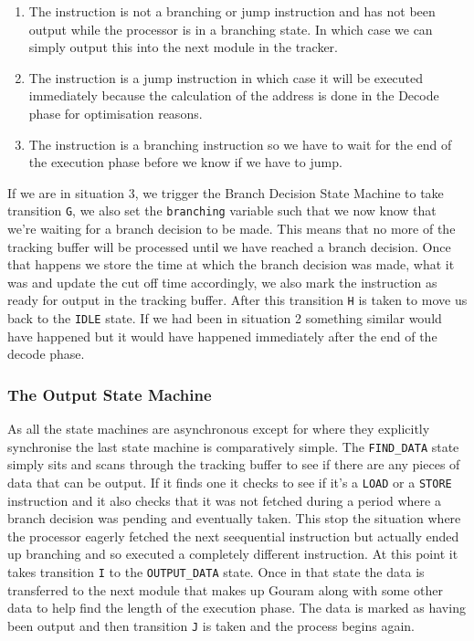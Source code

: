 \begin{enumerate}
	\item The instruction is not a branching or jump instruction and has not been output while the processor is in a branching state. In which case we can simply output this into the next module in the tracker.
	\item The instruction is a jump instruction in which case it will be executed immediately because the calculation of the address is done in the Decode phase for optimisation reasons.
	\item The instruction is a branching instruction so we have to wait for the end of the execution phase before we know if we have to jump.
\end{enumerate}

If we are in situation 3, we trigger the Branch Decision State Machine to take transition \texttt{G}, we also set the \texttt{branching} variable such that we now know that we're waiting for a branch decision to be made. This means that no more of the tracking buffer will be processed until we have reached a branch decision. Once that happens we store the time at which the branch decision was made, what it was and update the cut off time accordingly, we also mark the instruction as ready for output in the tracking buffer. After this transition \texttt{H} is taken to move us back to the \texttt{IDLE} state. If we had been in situation 2 something similar would have happened but it would have happened immediately after the end of the decode phase. 

\subsubsection{The Output State Machine}

As all the state machines are asynchronous except for where they explicitly synchronise the last state machine is comparatively simple. The \texttt{FIND\_DATA} state simply sits and scans through the tracking buffer to see if there are any pieces of data that can be output. If it finds one it checks to see if it's a \texttt{LOAD} or a \texttt{STORE} instruction and it also checks that it was not fetched during a period where a branch decision was pending and eventually taken. This stop the situation where the processor eagerly fetched the next seequential instruction but actually ended up branching and so executed a completely different instruction. At this point it takes transition \texttt{I} to the \texttt{OUTPUT\_DATA} state. Once in that state the data is transferred to the next module that makes up Gouram along with some other data to help find the length of the execution phase. The data is marked as having been output and then transition \texttt{J} is taken and the process begins again.

